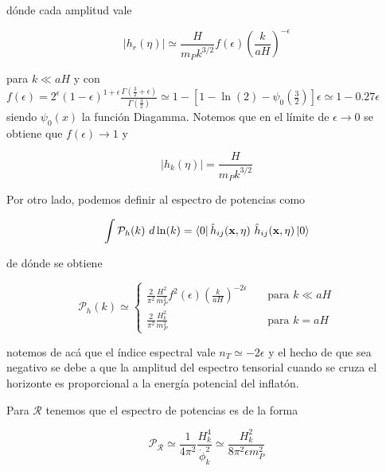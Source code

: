 \noindent
dónde cada amplitud vale

\begin{equation}
    \left| h_r (\eta) \right| \simeq \frac{H}{m_P k^{3/2}} f(\epsilon) \left(\frac{k}{aH} \right)^{- \epsilon}
\end{equation}

\noindent
para $k \ll aH$ y con $\displaystyle f (\epsilon) = 2^\epsilon (1 - \epsilon)^{\displaystyle 1 + \epsilon} \frac{\displaystyle \Gamma \left( \frac{3}{2} + \epsilon \right)}{\displaystyle \Gamma \left( \frac{3}{2}\right)} \simeq 1 - \left[ 1 - \ln (2) - \psi_0 \left( \frac{3}{2} \right) \right] \epsilon \simeq 1 - 0.27 \epsilon$ siendo $\psi_0 (x)$ la función Diagamma. Notemos que en el límite de $\epsilon \rightarrow 0$ se obtiene que $f (\epsilon) \rightarrow 1$ y

\begin{equation}
    \left| h_k (\eta) \right| =\frac{H}{m_P k^{3/2}}
\end{equation}

Por otro lado, podemos definir al espectro de potencias como

\begin{equation}
    \int \mathcal{P}_h (k) \ d\ln (k) = \bra{0} \hat{h}_{ij} (\textbf{x}, \eta) \ \hat{h}_{ij} (\textbf{x}, \eta) \ket{0}
\end{equation}

\noindent
de dónde se obtiene

\begin{equation}
    \mathcal{P}_h (k) \simeq \begin{cases}
        \displaystyle \frac{2}{\pi^2} \frac{H^2}{m^2_P} f^2 (\epsilon) \left( \frac{k}{a H} \right)^{- 2 \epsilon} \quad &\text{para } k \ll aH\\  
        \displaystyle \frac{2}{\pi^2} \frac{H^2_k}{m^2_P} \quad &\text{para } k = a H
    \end{cases}
\end{equation}

\noindent
notemos de acá que el índice espectral vale $n_T \simeq -2 \epsilon$ y el hecho de que sea negativo se debe a que la amplitud del espectro tensorial cuando se cruza el horizonte es proporcional a la energía potencial del inflatón.

Para $\mathcal{R}$ tenemos que el espectro de potencias es de la forma

\begin{equation}
    \mathcal{P}_\mathcal{R} \simeq \frac{1}{4 \pi^2} \frac{H^4_k}{\dot{\phi}^2_k} \simeq \frac{H_k^2}{8 \pi^2 \epsilon m^2_P}
\end{equation}

